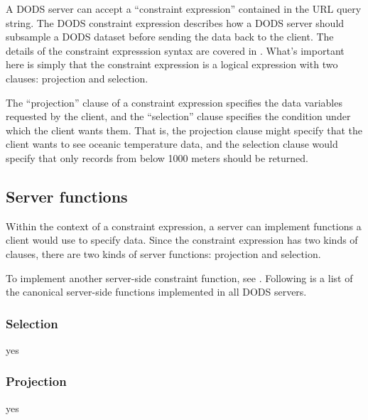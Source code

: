 A DODS server can accept a ``constraint expression'' contained in the
URL query string.  The DODS constraint expression describes how a DODS
server should subsample a DODS dataset before sending the data back to
the client.  The details of the constraint expresssion syntax are
covered in \OPDuser[constraint].  What's important here is simply
that the constraint expression is a logical expression with two
clauses: projection and selection.  

The ``projection'' clause of a constraint expression specifies the
data variables requested by the client, and the ``selection'' clause
specifies the condition under which the client wants them.  That is,
the projection clause might specify that the client wants to see
oceanic temperature data, and the selection clause would specify that
only records from below 1000 meters should be returned.

\subsection{Server functions}

Within the context of a constraint expression, a server can implement
functions a client would use to specify data.  Since the constraint
expression has two kinds of clauses, there are two kinds of server
functions: projection and selection.

To implement another server-side constraint function, see .  Following
is a list of the canonical server-side functions implemented in all
DODS servers.

\subsubsection{Selection}

yes


\subsubsection{Projection}


yes

